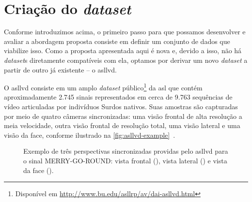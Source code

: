 \section{Criação do \textit{dataset}}
\label{sec:metodologia-datasets}

Conforme introduzimos acima, o primeiro passo para que possamos desenvolver e avaliar a abordagem proposta consiste em definir um conjunto de dados que viabilize isso. Como a proposta apresentada aqui é nova e, devido a isso, não há \textit{dataset}s diretamente compatíveis com ela, optamos por derivar um novo \textit{dataset} a partir de outro já existente -- o \acrfull{asllvd}.

O \acrshort{asllvd} consiste em um amplo \textit{dataset} público\footnote{Disponível em \url{http://www.bu.edu/asllrp/av/dai-asllvd.html}} da \acrshort{asl} que contém aproximadamente 2.745 sinais representados em cerca de 9.763 sequências de vídeo articuladas por indivíduos Surdos nativos. Suas amostras são capturadas por meio de quatro câmeras sincronizadas: uma visão frontal de alta resolução a meia velocidade, outra visão frontal de resolução total, uma visão lateral e uma visão da face, conforme ilustrado na \autoref{fig:asllvd-example}~\cite{athitsos-2008-asllvd,neidle-2012-asllvd}.

\begin{figure}[ht!]
    \centering
    \caption{\textmd{Exemplo de três perspectivas sincronizadas providas pelo \acrshort{asllvd} para o sinal MERRY-GO-ROUND: 
    vista frontal (), 
    vista lateral () e 
    vista da face ().}}
    \hfill
    \hfill
    \label{fig:asllvd-example}
\end{figure}



